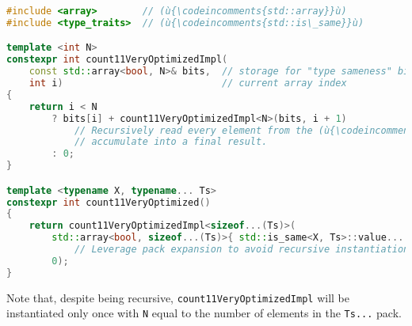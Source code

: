 \begin{lstlisting}[language=C++]
#include <array>        // (ù{\codeincomments{std::array}}ù)
#include <type_traits>  // (ù{\codeincomments{std::is\_same}}ù)

template <int N>
constexpr int count11VeryOptimizedImpl(
    const std::array<bool, N>& bits,  // storage for "type sameness" bits
    int i)                            // current array index
{
    return i < N
        ? bits[i] + count11VeryOptimizedImpl<N>(bits, i + 1)
            // Recursively read every element from the (ù{\codeincomments{bits}}ù) array and
            // accumulate into a final result.
        : 0;
}

template <typename X, typename... Ts>
constexpr int count11VeryOptimized()
{
    return count11VeryOptimizedImpl<sizeof...(Ts)>(
        std::array<bool, sizeof...(Ts)>{ std::is_same<X, Ts>::value... },
            // Leverage pack expansion to avoid recursive instantiations.
        0);
}
\end{lstlisting}

\noindent Note that, despite being recursive, \texttt{count11VeryOptimizedImpl}
will be instantiated only once with \texttt{N} equal to the number of
elements in the \texttt{Ts...} pack.



